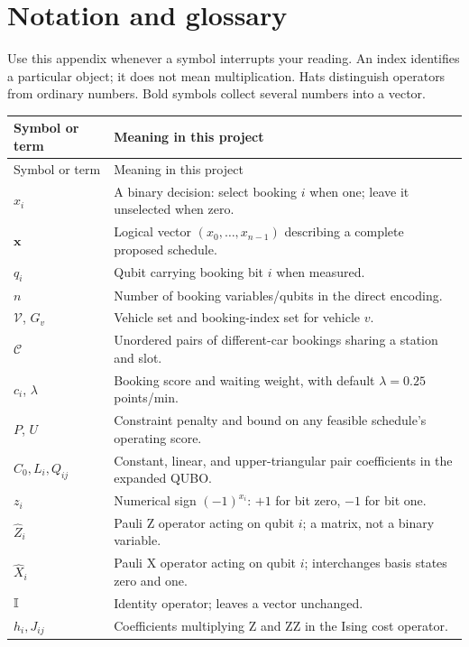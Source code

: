 \section{Notation and glossary}\label{app:glossary}
Use this appendix whenever a symbol interrupts your reading. An index identifies
a particular object; it does not mean multiplication. Hats distinguish operators
from ordinary numbers. Bold symbols collect several numbers into a vector.

\renewcommand{\arraystretch}{1.12}
\begin{longtable}{@{}p{}>{\raggedright\arraybackslash}p{}@{}}
\toprule
Symbol or term & Meaning in this project\\
\midrule
\endfirsthead
\toprule
Symbol or term & Meaning in this project\\
\midrule
\endhead
\bottomrule
\endfoot
$x_i$ & A binary decision: select booking $i$ when one; leave it unselected when zero.\\
$\boldsymbol{x}$ & Logical vector $(x_0,\ldots,x_{n-1})$ describing a complete proposed schedule.\\
$q_i$ & Qubit carrying booking bit $i$ when measured.\\
$n$ & Number of booking variables/qubits in the direct encoding.\\
$\mathcal V$, $G_v$ & Vehicle set and booking-index set for vehicle $v$.\\
$\mathcal C$ & Unordered pairs of different-car bookings sharing a station and slot.\\
$c_i$, $\lambda$ & Booking score and waiting weight, with default $\lambda=0.25$ points/min.\\
$P$, $U$ & Constraint penalty and bound on any feasible schedule's operating score.\\
$C_0,L_i,Q_{ij}$ & Constant, linear, and upper-triangular pair coefficients in the expanded QUBO.\\
$z_i$ & Numerical sign $(-1)^{x_i}$: $+1$ for bit zero, $-1$ for bit one.\\
$\widehat Z_i$ & Pauli Z operator acting on qubit $i$; a matrix, not a binary variable.\\
$\widehat X_i$ & Pauli X operator acting on qubit $i$; interchanges basis states zero and one.\\
$\mathbb{I}$ & Identity operator; leaves a vector unchanged.\\
$h_i,J_{ij}$ & Coefficients multiplying Z and ZZ in the Ising cost operator.\\

\end{longtable}
